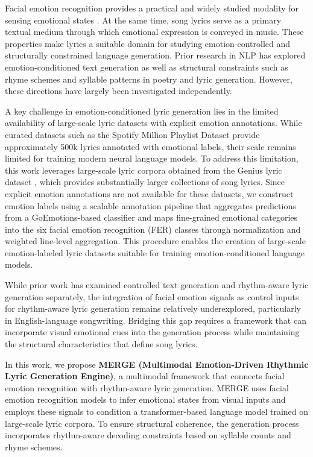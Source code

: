 \documentclass[11pt]{article}
\begin{document}
Facial emotion recognition provides a practical and widely studied modality for sensing emotional states \cite{goodfellow2013challenges, li2017reliable}. At the same time, song lyrics serve as a primary textual medium through which emotional expression is conveyed in music. These properties make lyrics a suitable domain for studying emotion-controlled and structurally constrained language generation. Prior research in NLP has explored emotion-conditioned text generation as well as structural constraints such as rhyme schemes and syllable patterns in poetry and lyric generation. However, these directions have largely been investigated independently.

A key challenge in emotion-conditioned lyric generation lies in the limited availability of large-scale lyric datasets with explicit emotion annotations. While curated datasets such as the Spotify Million Playlist Dataset \cite{devdope_2023_spotify_900k} provide approximately 500k lyrics annotated with emotional labels, their scale remains limited for training modern neural language models. To address this limitation, this work leverages large-scale lyric corpora obtained from the Genius lyric dataset \cite{lim2021expertise}, which provides substantially larger collections of song lyrics. Since explicit emotion annotations are not available for these datasets, we construct emotion labels using a scalable annotation pipeline that aggregates predictions from a GoEmotions-based classifier and maps fine-grained emotional categories into the six facial emotion recognition (FER) classes through normalization and weighted line-level aggregation. This procedure enables the creation of large-scale emotion-labeled lyric datasets suitable for training emotion-conditioned language models.

While prior work has examined controlled text generation and rhythm-aware lyric generation separately, the integration of facial emotion signals as control inputs for rhythm-aware lyric generation remains relatively underexplored, particularly in English-language songwriting. Bridging this gap requires a framework that can incorporate visual emotional cues into the generation process while maintaining the structural characteristics that define song lyrics.

In this work, we propose \textbf{MERGE (Multimodal Emotion-Driven Rhythmic Lyric Generation Engine)}, a multimodal framework that connects facial emotion recognition with rhythm-aware lyric generation. MERGE uses facial emotion recognition models to infer emotional states from visual inputs and employs these signals to condition a transformer-based language model trained on large-scale lyric corpora. To ensure structural coherence, the generation process incorporates rhythm-aware decoding constraints based on syllable counts and rhyme schemes.
\end{document}
